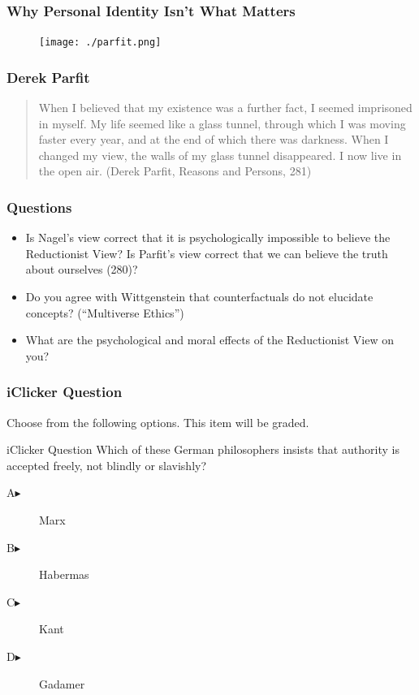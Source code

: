 \documentclass[xcolor=dvipsnames]{beamer}
\begin{document}
\begin{frame}
  \frametitle{Why Personal Identity Isn't What Matters}
  \begin{figure}[h]
    \texttt{[image: ./parfit.png]}
  \end{figure}
\end{frame}

\begin{frame}
  \frametitle{Derek Parfit}
  \begin{quote}
    When I believed that my existence was a further fact, I seemed
    imprisoned in myself. My life seemed like a glass tunnel, through
    which I was moving faster every year, and at the end of which
    there was darkness. When I changed my view, the walls of my glass
    tunnel disappeared. I now live in the open air. (Derek Parfit,
    Reasons and Persons, 281)
  \end{quote}
\end{frame}

\begin{frame}
  \frametitle{Questions}
  \begin{itemize}
  \item Is Nagel's view correct that it is psychologically impossible
    to believe the Reductionist View? Is Parfit's view correct that we
    can believe the truth about ourselves (280)?
  \item Do you agree with Wittgenstein that counterfactuals do not
    elucidate concepts? (``Multiverse Ethics'')
  \item What are the psychological and moral effects of the
    Reductionist View on you?
  \end{itemize}
\end{frame}

\begin{frame}
  \frametitle{iClicker Question}
Choose from the following options. This item will be graded.
\begin{block}{iClicker Question}
  Which of these German philosophers insists that authority is
  accepted freely, not blindly or slavishly?
\end{block}
\begin{description}
\item[A\hspace{.2in}$\blacktriangleright$] Marx
\item[B\hspace{.2in}$\blacktriangleright$] Habermas
\item[C\hspace{.2in}$\blacktriangleright$] Kant
\item[D\hspace{.2in}$\blacktriangleright$] Gadamer
\end{description}
\end{frame}
\end{document}
